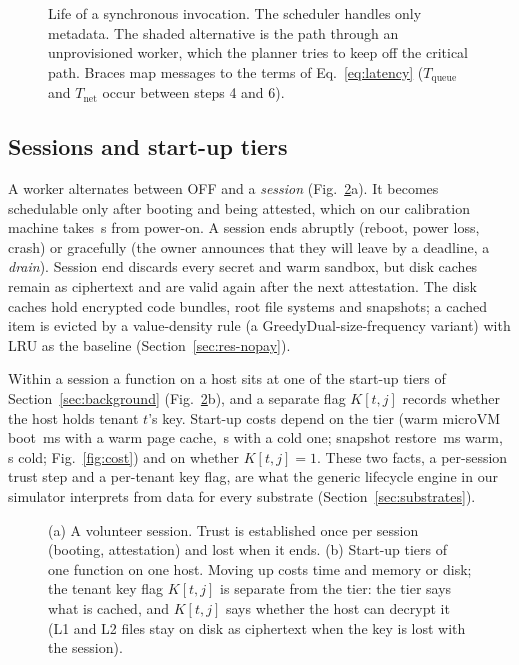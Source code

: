 \begin{figure}[t]
\centering

\caption{Life of a synchronous invocation. The scheduler handles only metadata. The shaded alternative is the path through an unprovisioned worker, which the planner tries to keep off the critical path.
Braces map messages to the terms of Eq.~\eqref{eq:latency} ($T_{\text{queue}}$ and $T_{\text{net}}$ occur between steps 4 and 6).}
\label{fig:seq}
\end{figure}

\subsection{Sessions and start-up tiers}
\label{sec:lifecycle}
A worker alternates between OFF and a \emph{session} (Fig.~\ref{fig:lifecycle}a). It becomes schedulable only after booting
and being attested, which on our calibration machine takes \CalAttested\,s from power-on. A session ends abruptly (reboot, power loss, crash) or
gracefully (the owner announces that they will leave by a deadline, a \emph{drain}). Session end discards every secret and warm sandbox, but disk
caches remain as ciphertext and are valid again after the next attestation. The disk caches hold encrypted code bundles, root file systems and snapshots; a cached item is evicted by a value-density rule (a GreedyDual-size-frequency variant) with LRU as the baseline (Section~\ref{sec:res-nopay}).

Within a session a function on a host sits at one of the start-up tiers of Section~\ref{sec:background}
(Fig.~\ref{fig:lifecycle}b), and a separate flag $K[t,j]$ records whether the host holds tenant $t$'s key. Start-up costs depend on the tier
(warm microVM boot \CalFcBootWarmMs\,ms with a warm page cache, \CalFcBootColdS\,s with a cold one; snapshot restore
\CalRestoreWarmMs\,ms warm, \CalRestoreColdS\,s cold; Fig.~\ref{fig:cost}) and on whether $K[t,j]=1$. These two facts, a per-session trust step and a
per-tenant key flag, are what the generic lifecycle engine in our simulator interprets from data for every substrate (Section~\ref{sec:substrates}).

\begin{figure}[t]
\centering
\resizebox{\textwidth}{!}{}
\caption{(a) A volunteer session. Trust is established once per session (booting, attestation) and lost when it ends.
(b) Start-up tiers of one function on one host. Moving up costs time and memory or disk; the tenant key flag $K[t,j]$ is
separate from the tier: the tier says what is cached, and $K[t,j]$ says whether the host can decrypt it (L1 and L2 files stay on disk as ciphertext when the key is lost with the session).}
\label{fig:lifecycle}
\end{figure}

